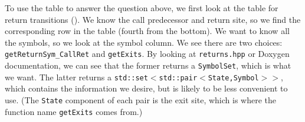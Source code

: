 To use the table to answer the question above, we first look at the table for
return transitions (). We know the call
predecessor and return site, so we find the corresponding row in the table
(fourth from the bottom). We want to know all the symbols, so we look at the
symbol column. We see there are two choices: \texttt{getReturnSym\_CallRet}
and \texttt{getExits}. By looking at \texttt{returns.hpp} or Doxygen
documentation, we can see that the former returns a \texttt{SymbolSet}, which
is what we want. The latter returns
a \texttt{std::set$<$std::pair$<$State,Symbol$>>$}, which contains the
information we desire, but is likely to be less convenient to
use. (The \texttt{State} component of each pair is the exit site, which is
where the function name \texttt{getExits} comes from.)



\newcommand{\RP}{\tnote{1}} %

\setlength{\extrarowheight}{4pt}


